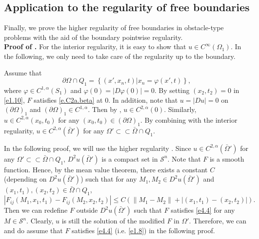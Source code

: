 \documentclass[preprint,12pt]{elsarticle}
\theoremstyle{definition}
\theoremstyle{remark}
\numberwithin{equation}{section}
\begin{document}
\subsection{Application to the regularity of free boundaries}

Finally, we prove the higher regularity of free boundaries in obstacle-type problems with the aid of the boundary pointwise regularity.\\
\noindent\textbf{Proof of .} For the interior regularity, it is easy to show that $u\in C^{\infty}(\Omega_1)$. In the following, we only need to take care of the regularity up to the boundary.

Assume that
\begin{equation*}
  \partial \Omega\cap Q_1=\left\{(x',x_n,t)\big| x_n=\varphi(x',t)\right\},
\end{equation*}
where $\varphi \in C^{1,\alpha}(S_1)$ and $\varphi(0)=|D\varphi(0)|=0$. By setting $(x_2,t_2)=0$ in \cref{e1.10}, $F$ satisfies \cref{e.C2a.beta} at $0$. In addition, note that $u=|Du|=0$ on $(\partial \Omega)_1$ and $(\partial \Omega)_1\in C^{1,\alpha}$. Then by , $u\in C^{2,\alpha}(0)$. Similarly, $u\in C^{2,\alpha}(x_0,t_0)$ for any $(x_0,t_0)\in (\partial \Omega)_1$. By combining with the interior regularity, $u\in C^{2,\alpha}(\bar\Omega')$ for any $\Omega'\subset\subset \bar\Omega\cap Q_1$.

In the following proof, we will use the higher regularity . Since $u\in C^{2,\alpha}(\bar\Omega')$ for any $\Omega'\subset\subset \bar\Omega\cap Q_1$, $D^2u(\bar\Omega')$ is a compact set in $\mathcal{S}^n$. Note that $F$ is a smooth function. Hence, by the mean value theorem, there exists a constant $C$ (depending on $D^2u(\bar\Omega')$) such that for any $M_1,M_2\in D^2u(\bar\Omega')$ and $(x_1,t_1),(x_2,t_2)\in \bar\Omega\cap Q_1$,
\begin{equation}\label{e4.4}
|F_{ij}(M_1,x_1,t_1)-F_{ij}(M_2,x_2,t_2)|\leq C(\|M_1-M_2\|+|(x_1,t_1)-(x_2,t_2)|).
\end{equation}
Then we can redefine $F$ outside $D^2u(\bar\Omega')$ such that $F$ satisfies \cref{e4.4} for any $M\in \mathcal{S}^n$. Clearly, $u$ is still the solution of the modified $F$ in $\Omega'$. Therefore, we can and do assume that $F$ satisfies \cref{e4.4} (i.e. \cref{e1.8}) in the following proof.
\end{document}

